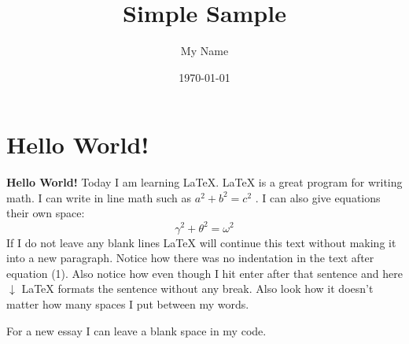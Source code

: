 \documentclass{article} %
\title{Simple Sample} %
\author{My Name} %
\date{\today} %
\begin{document}
\maketitle %

\section{Hello World!} %

\textbf{Hello World!} Today I am learning \LaTeX. %
\LaTeX{} is a great program for writing math. I can write in line math such as $a^2+b^2=c^2$ %
. I can also give equations their own space:
\begin{equation} %
  \gamma^2+\theta^2=\omega^2
\end{equation}
If I do not leave any blank lines \LaTeX{} will continue  this text without making it into a new paragraph.  Notice how there was no indentation in the text after equation (1).
Also notice how even though I hit enter after that sentence and here $\downarrow$
\LaTeX{} formats the sentence without any break.  Also   look  how      it   doesn't     matter          how    many  spaces     I put     between       my    words.

For a new essay I can leave a blank space in my code.
\end{document}

